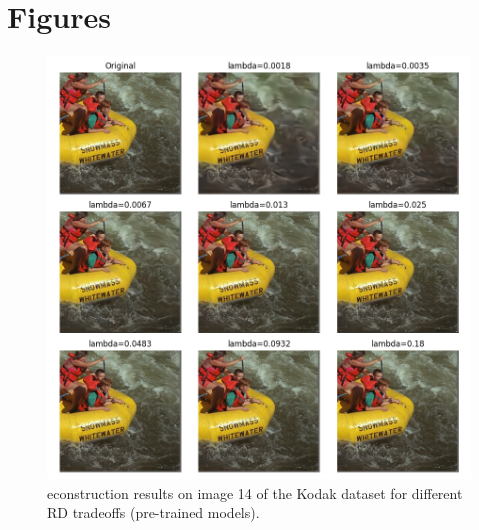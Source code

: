 \chapter{Figures}

\begin{figure}
    \centering
    \includegraphics[width=15cm]{../img/bdpsnr_kodak_14_pretrained.png}
    \caption[econstruction results on image 14 of the Kodak dataset for different RD tradeoffs (pre-trained models).]{econstruction results on image 14 of the Kodak dataset for different RD tradeoffs (pre-trained models).}
    \label{appendix:bdpsnr_1:a}
\end{figure}

